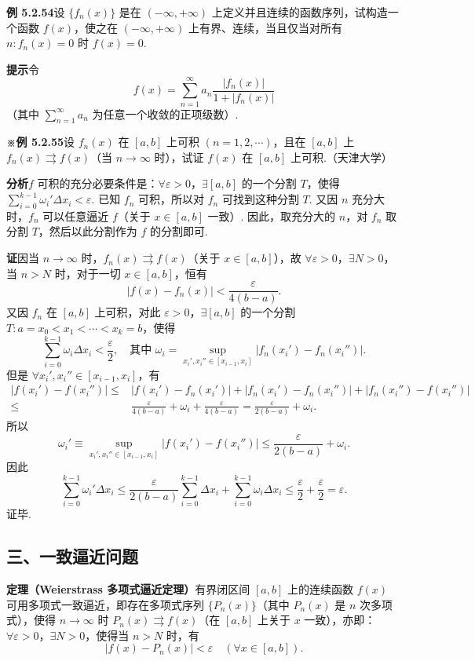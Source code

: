 \documentclass[UTF8,12pt,a4paper,fontset=fandol]{ctexart}
\begin{document}
\noindent\textbf{例 5.2.54}\quad 设 $\{f_n(x)\}$ 是在 $(-\infty,+\infty)$ 上定义并且连续的函数序列，试构造一个函数
$f(x)$，使之在 $(-\infty,+\infty)$ 上有界、连续，当且仅当对所有 $n:f_n(x)=0$ 时
$f(x)=0$.

\noindent\textbf{提示}\quad 令
\[
  f(x)=\sum_{n=1}^{\infty}a_n\frac{|f_n(x)|}{1+|f_n(x)|}
\]
（其中 $\displaystyle\sum_{n=1}^{\infty}a_n$ 为任意一个收敛的正项级数）.

\noindent\textbf{※例 5.2.55}\quad 设 $f_n(x)$ 在 $[a,b]$ 上可积 $(n=1,2,\cdots)$，且在 $[a,b]$ 上
$f_n(x)\rightrightarrows f(x)$（当 $n\to\infty$ 时），试证 $f(x)$ 在 $[a,b]$ 上可积.（天津大学）

\noindent\textbf{分析}\quad $f$ 可积的充分必要条件是：$\forall\varepsilon>0$，$\exists [a,b]$ 的一个分割 $T$，使得
$\displaystyle\sum_{i=0}^{k-1}\omega_i'\Delta x_i<\varepsilon$. 已知 $f_n$ 可积，所以对 $f_n$ 可找到这种分割 $T$.
又因 $n$ 充分大时，$f_n$ 可以任意逼近 $f$（关于 $x\in[a,b]$ 一致）. 因此，取充分大的 $n$，对 $f_n$ 取分割
$T$，然后以此分割作为 $f$ 的分割即可.

\noindent\textbf{证}\quad 因当 $n\to\infty$ 时，$f_n(x)\rightrightarrows f(x)$（关于 $x\in[a,b]$），故
$\forall\varepsilon>0$，$\exists N>0$，当 $n>N$ 时，对于一切 $x\in[a,b]$，恒有
\[
  |f(x)-f_n(x)|<\frac{\varepsilon}{4(b-a)}.
\]
又因 $f_n$ 在 $[a,b]$ 上可积，对此 $\varepsilon>0$，$\exists [a,b]$ 的一个分割
$T:a=x_0<x_1<\cdots<x_k=b$，使得
\[
  \sum_{i=0}^{k-1}\omega_i\Delta x_i<\frac\varepsilon2,\quad
  \text{其中 }\omega_i=\sup_{x_i',x_i''\in[x_{i-1},x_i]}|f_n(x_i')-f_n(x_i'')|.
\]
但是 $\forall x_i',x_i''\in[x_{i-1},x_i]$，有
\[
\begin{aligned}
|f(x_i')-f(x_i'')|
\le{}& |f(x_i')-f_n(x_i')|+|f_n(x_i')-f_n(x_i'')|
+|f_n(x_i'')-f(x_i'')|\\
\le{}&\frac{\varepsilon}{4(b-a)}+\omega_i+\frac{\varepsilon}{4(b-a)}
=\frac{\varepsilon}{2(b-a)}+\omega_i.
\end{aligned}
\]
所以
\[
  \omega_i'\equiv\sup_{x_i',x_i''\in[x_{i-1},x_i]}|f(x_i')-f(x_i'')|
  \le\frac{\varepsilon}{2(b-a)}+\omega_i.
\]
因此
\[
  \sum_{i=0}^{k-1}\omega_i'\Delta x_i
  \le\frac{\varepsilon}{2(b-a)}\sum_{i=0}^{k-1}\Delta x_i
  +\sum_{i=0}^{k-1}\omega_i\Delta x_i
  \le\frac\varepsilon2+\frac\varepsilon2=\varepsilon.
\]
证毕.

\subsection*{三、一致逼近问题}

\noindent\textbf{定理（Weierstrass 多项式逼近定理）}\quad 有界闭区间 $[a,b]$ 上的连续函数 $f(x)$ 可用多项式一致逼近，即存在多项式序列
$\{P_n(x)\}$（其中 $P_n(x)$ 是 $n$ 次多项式），使得 $n\to\infty$ 时
$P_n(x)\rightrightarrows f(x)$（在 $[a,b]$ 上关于 $x$ 一致），亦即：
$\forall\varepsilon>0$，$\exists N>0$，使得当 $n>N$ 时，有
\[
  |f(x)-P_n(x)|<\varepsilon\quad(\forall x\in[a,b]).
\]
\end{document}
